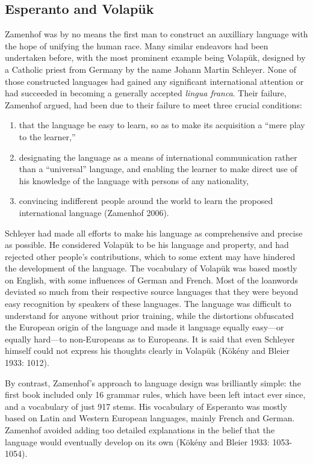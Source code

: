 \subsection{Esperanto and Volapük}
Zamenhof was by no means the first man to construct an auxilliary language with the hope of unifying the human race.
Many similar endeavors had been undertaken before, with the most prominent example being Volapük, designed by a Catholic priest from Germany by the name Johann Martin Schleyer.
None of those constructed languages had gained any significant international attention or had succeeded in becoming a generally accepted \textit{lingua franca}.
Their failure, Zamenhof argued, had been due to their failure to meet three crucial conditions:

\begin{enumerate}
  \item that the language be easy to learn, so as to make its acquisition a ``mere play to the learner,''
  \item designating the language as a means of international communication rather than a ``universal'' language, and enabling the learner to make direct use of his knowledge of the language with persons of any nationality,
  \item convincing indifferent people around the world to learn the proposed international language (Zamenhof 2006).
\end{enumerate}

Schleyer had made all efforts to make his language as comprehensive and precise as possible.
He considered Volapük to be his language and property, and had rejected other people's contributions, which to some extent may have hindered the development of the language.
The vocabulary of Volapük was based mostly on English, with some influences of German and French.
Most of the loanwords deviated so much from their respective source languages that they were beyond easy recognition by speakers of these languages.
The language was difficult to understand for anyone without prior training, while the distortions obfuscated the European origin of the language and made it language equally easy---or equally hard---to non-Europeans as to Europeans.
It is said that even Schleyer himself could not express his thoughts clearly in Volapük
(Kökény and Bleier 1933: 1012).

By contrast, Zamenhof's approach to language design was brilliantly simple: the first book included only 16 grammar rules, which have been left intact ever since, and a vocabulary of just 917 stems.
His vocabulary of Esperanto was mostly based on Latin and Western European languages, mainly French and German.
Zamenhof avoided adding too detailed explanations in the belief that the language would eventually develop on its own
(Kökény and Bleier 1933: 1053-1054).


